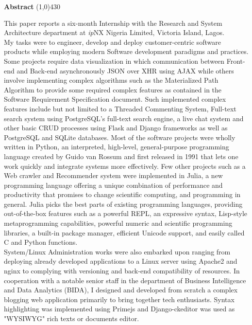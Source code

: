 \begin{center}
	{\huge \bf Abstract}
	\line(1,0){430}
\end{center}

This paper reports a six-month Internship with the Research and System Architecture department at \textit{ip}NX Nigeria Limited, Victoria Island, Lagos.\\ 

My tasks were to engineer, develop and deploy customer-centric software products while employing modern Software development paradigms and practices. Some projects require data visualization in which communication between Front-end and Back-end asynchronously \ac{JSON} over \ac{XHR} using \ac{AJAX} while others involve implementing complex algorithms such as the Materialized Path Algorithm to provide some required complex features as contained in the Software Requirement Specification document. Such implemented complex features include but not limited to a Threaded Commenting System, Full-text search system using PostgreSQL's full-text search engine, a live chat system and other basic \ac{CRUD} processes using Flask and Django frameworks as well as PostgreSQL and SQLite databases. Most of the software projects were wholly written in Python, an interpreted, high-level, general-purpose programming language created by Guido van Rossum and first released in 1991 that lets one work quickly and integrate systems more effectively. Few other projects such as a Web crawler and Recommender system were implemented in Julia, a new programming language offering a unique combination of performance and productivity that promises to change scientific computing, and programming in general.
Julia picks the best parts of existing programming languages, providing out-of-the-box features such as a powerful \ac{REPL}, an expressive syntax, Lisp-style metaprogramming capabilities, powerful numeric and scientific programming libraries, a built-in package manager, efficient Unicode support, and easily called C and Python functions.\\

System/Linux Administration works were also embarked upon ranging from deploying already developed applications to a Linux server using Apache2 and nginx to complying with versioning and back-end compatibility of resources. In cooperation with a notable senior staff in the department of Business Intelligence and Data Analytics (BIDA), I designed and developed from scratch a complex blogging web application  primarily to bring together tech enthusiasts.  Syntax highlighting was implemented using Primejs and Django-ckeditor was used as "\ac{WYSIWYG}" rich texts or documents editor.
\clearpage